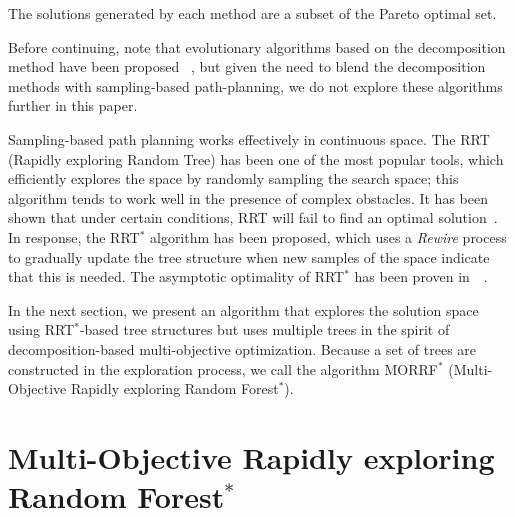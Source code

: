 \documentclass{article}
\begin{document}
The solutions generated by each method are a subset of the Pareto optimal set.

Before continuing, note that evolutionary algorithms based on the decomposition method have been proposed ~\cite{6600851}, but given the need to blend the decomposition methods with sampling-based path-planning, we do not explore these algorithms further in this paper.

Sampling-based path planning works effectively in continuous space. 
The RRT (Rapidly exploring Random Tree) has been one of the most popular tools, which  efficiently explores the space by randomly sampling the search space; this algorithm tends to work well in the presence of complex obstacles.
It has been shown that under certain conditions, RRT will fail to find an optimal solution~\cite{Karaman.Frazzoli:RSS10}. 
In response, the RRT$^{*}$ algorithm has been proposed, which uses a \emph{Rewire} process to gradually update the tree structure when new samples of the space indicate that this is needed.
The asymptotic optimality of RRT$^{*}$ has been proven in~\cite{Karaman.Frazzoli:RSS10}~\cite{Karaman:2011:SAO:2000201.2000209}. 

In the next section, we present an algorithm that explores the solution space using RRT$^{*}$-based tree structures but uses multiple trees in the spirit of decomposition-based multi-objective optimization.
Because a set of trees are constructed in the exploration process, we call the algorithm MORRF$^{*}$ (Multi-Objective Rapidly exploring Random Forest$^{*}$).


\section{Multi-Objective Rapidly exploring Random Forest$^{*}$}
\label{sec:morrt}
\end{document}
